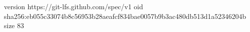 version https://git-lfs.github.com/spec/v1
oid sha256:eb055c33074b8c56953b28aeafcf834bae0057b9b3ac480db513d1a52346204b
size 83
